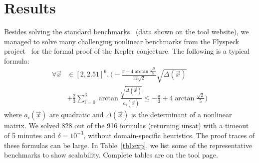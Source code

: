 \documentclass[envcountsect]{llncs}
\begin{document}
\section{Results}

Besides solving the standard benchmarks~\cite{DBLP:conf/cade/JovanovicM12} (data shown on the tool website), we managed to solve many challenging nonlinear benchmarks from the Flyspeck project~\cite{DBLP:conf/dagstuhl/Hales05} for the formal proof of the Kepler conjecture. The following is a typical formula:
\begin{align*}
\forall \vec x&\in [2, 2.51]^6.\ \Big( -\frac{\pi-4\arctan\frac{\sqrt
2}{5}}{12\sqrt2}\sqrt{\Delta(\vec x)}\\
&+\frac{2}{3}\sum_{i=0}^3\arctan\frac{\sqrt{\Delta(\vec x)}}{a_i(\vec x)}\leq
-\frac{\pi}{3}+4\arctan\frac{\sqrt 2}{5}\Big)
\end{align*}
where $a_i(\vec x)$ are quadratic and $\Delta(\vec x)$ is the
determinant of a nonlinear matrix. We solved 828 out of the 916 formulas (returning {\sf
  unsat}) with a timeout of 5 minutes and $\delta=10^{-3}$, without domain-specific heuristics. The proof traces of these formulas can be large. In Table~\ref{tbl:exp}, we list
some of the representative benchmarks to show scalability. Complete
tables are on the tool page.




\end{document}
